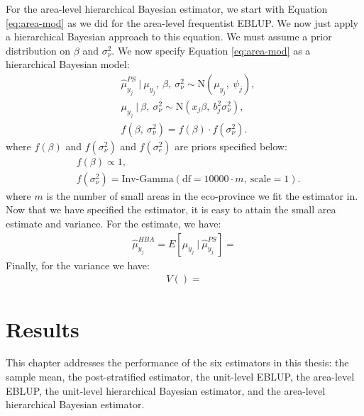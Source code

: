 \documentclass[12pt,twoside]{reedthesis}
\begin{document}
For the area-level hierarchical Bayesian estimator, we start with Equation \eqref{eq:area-mod} as we did for the area-level frequentist EBLUP. We now just apply a hierarchical Bayesian approach to this equation. We must assume a prior distribution on \(\beta\) and \(\sigma^2_\nu\). We now specify Equation \eqref{eq:area-mod} as a hierarchical Bayesian model:
\begin{align}
&\hat\mu_{y_j}^{PS} ~\vert~ \mu_{y_j},~ \beta,~ \sigma^2_\nu \sim \text{N}(\mu_{y_j},~ \psi_j), \nonumber \\
&\mu_{y_j} ~\vert~ \beta,~ \sigma^2_\nu \sim \text{N}(x_j\beta,~ b_j^2 \sigma^2_\nu),\nonumber \\
&f(\beta,~ \sigma^2_\nu) = f(\beta)\cdot f(\sigma^2_\nu).
\end{align}
where \(f(\beta)\) and \(f(\sigma^2_\nu)\) and \(f(\sigma^2_e)\) are priors specified below:
\begin{align*}
&f(\beta) \propto 1, \\
&f(\sigma^2_\nu) = \text{Inv-Gamma}(\text{df} = 10000 \cdot m,~ \text{scale} = 1).
\end{align*}
where \(m\) is the number of small areas in the eco-province we fit the estimator in. Now that we have specified the estimator, it is easy to attain the small area estimate and variance. For the estimate, we have:
\begin{align}
\hat\mu_{y_j}^{HBA} = E[\mu_{y_j} ~\vert~ \hat\mu_{y_j}^{PS}] = 
\end{align}
Finally, for the variance we have:
\begin{align}
V() = 
\end{align}
\hypertarget{results}{%
\chapter{Results}\label{results}}

This chapter addresses the performance of the six estimators in this thesis: the sample mean, the post-stratified estimator, the unit-level EBLUP, the area-level EBLUP, the unit-level hierarchical Bayesian estimator, and the area-level hierarchical Bayesian estimator.
\end{document}
